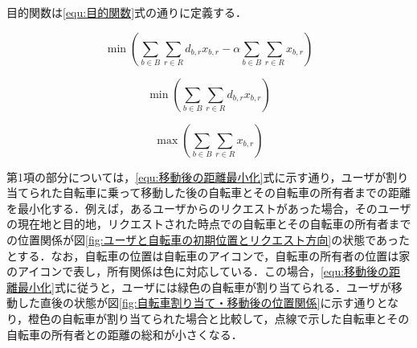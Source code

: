          \par 目的関数は\ref{equ:目的関数}式の通りに定義する．
          
          \begin{equation}\label{equ:目的関数}
            \min \left( \sum_{b \in B}\sum_{r \in R}d_{b,r}x_{b,r} - \alpha\sum_{b \in B}\sum_{r \in R}x_{b,r} \right)
          \end{equation}
          
          \begin{equation}\label{equ:移動後の距離最小化}
            \min \left( \sum_{b \in B}\sum_{r \in R}d_{b,r}x_{b,r} \right)
          \end{equation}
          
          \begin{equation}\label{equ:割り当て成功率最大化}
            \max \left(\sum_{b \in B}\sum_{r \in R}x_{b,r} \right)
          \end{equation}
          
          \par 第1項の部分については，\ref{equ:移動後の距離最小化}式に示す通り，ユーザが割り当てられた自転車に乗って移動した後の自転車とその自転車の所有者までの距離を最小化する．例えば，あるユーザからのリクエストがあった場合，そのユーザの現在地と目的地，リクエストされた時点での自転車とその自転車の所有者までの位置関係が図\ref{fig:ユーザと自転車の初期位置とリクエスト方向}の状態であったとする．なお，自転車の位置は自転車のアイコンで，自転車の所有者の位置は家のアイコンで表し，所有関係は色に対応している．この場合，\ref{equ:移動後の距離最小化}式に従うと，ユーザには緑色の自転車が割り当てられる．ユーザが移動した直後の状態が図\ref{fig:自転車割り当て・移動後の位置関係}に示す通りとなり，橙色の自転車が割り当てられた場合と比較して，点線で示した自転車とその自転車の所有者との距離の総和が小さくなる．
          
